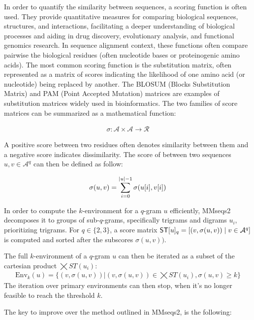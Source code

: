 In order to quantify the similarity between sequences, a scoring function is often used. They provide quantitative measures for comparing biological sequences, structures, and interactions, facilitating a deeper understanding of biological processes and aiding in drug discovery, evolutionary analysis, and functional genomics research. In sequence alignment context, these functions often compare pairwise the biological residues (often nucleotide bases or proteinogenic amino acids). The most common scoring function is the substitution matrix, often represented as a matrix of scores indicating the likelihood of one amino acid (or nucleotide) being replaced by another. The BLOSUM (Blocks Substitution Matrix) and PAM (Point Accepted Mutation) matrices are examples of substitution matrices widely used in bioinformatics. The two families of score matrices can be summarized as a mathematical function:

\begin{align}
\sigma: \mathcal{A} \times \mathcal{A} \rightarrow \mathcal{R}
\end{align}

 A positive score between two residues often denotes similarity between them and a negative score indicates dissimilarity. The score of between two sequences \(u,v\in \mathcal{A}^q\) can then be defined as follow:

\begin{align}
\sigma(u,v)=\sum_{i=0}^{|u|-1}\sigma(u\lbrack i\rbrack,v\lbrack i\rbrack)\label{equation:sequenceScore}
\end{align}

In order to compute the $k$-environment for a \(q\)-gram \(u\) efficiently, MMseqs2 decomposes it to groups of sub-\(q\)-grams, specifically trigrams and digrams \(u_i\), prioritizing trigrams. For \(q\in \{2,3\}\), a score matrix \(\mathsf{ST}\lbrack u\rbrack_q=\lbrack (v,\sigma(u,v))\mid v\in\mathcal{A}^{q}\rbrack\) is computed and sorted after the subscores \(\sigma(u,v))\).

The full $k$-environment of a \(q\)-gram \(u\) can then be iterated as a subset of the cartesian product \(\bigtimes ST(u_i)\):
\begin{align}
\text{Env}_k(u) = \{(v,\sigma(u,v))|(v,\sigma(u,v))\in \bigtimes ST(u_i),\sigma(u,v)\geq k\}\label{ScoreTablesCartesian}
\end{align}
The iteration over primary environments can then stop, when it's no longer feasible to reach the threshold \(k\).

The key to improve over the method outlined in MMseqs2, is the following:

